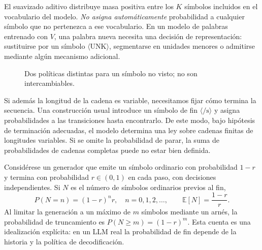 El suavizado aditivo distribuye masa positiva entre los $K$ símbolos
incluidos en el vocabulario del modelo. \emph{No asigna automáticamente}
probabilidad a cualquier símbolo que no pertenezca a ese vocabulario.
En un modelo de palabras entrenado con $V$, una palabra nueva necesita
una decisión de representación: sustituirse por un símbolo
$\langle\mathrm{UNK}\rangle$, segmentarse en unidades menores o
admitirse mediante algún mecanismo adicional.

\begin{figure}[H]\centering
{}
\caption{Dos políticas distintas para un símbolo no visto; no son intercambiables.}
\end{figure}

Si además la longitud de la cadena es variable, necesitamos fijar
cómo termina la secuencia. Una construcción usual introduce un símbolo
de fin $\langle/\mathrm{s}\rangle$ y asigna probabilidades a las
transiciones hasta encontrarlo. De este modo, bajo hipótesis de
terminación adecuadas, el modelo determina una ley sobre cadenas
finitas de longitudes variables. Si se omite la probabilidad de parar,
la suma de probabilidades de cadenas completas puede no estar
bien definida.

\begin{ejemplo}
Considérese un generador que emite un símbolo ordinario con probabilidad
$1-r$ y termina con probabilidad $r\in(0,1)$ en cada paso, con decisiones
independientes. Si $N$ es el número de símbolos ordinarios previos al fin,
\[
P(N=n)=(1-r)^nr,\quad n=0,1,2,\ldots,
\qquad \mathbb E[N]=\frac{1-r}{r}.
\]
Al limitar la generación a un máximo de $m$ símbolos mediante un arnés,
la probabilidad de truncamiento es $P(N\ge m)=(1-r)^m$.
Esta cuenta es una idealización explícita: en un LLM real la probabilidad
de fin depende de la historia y la política de decodificación.
\end{ejemplo}

